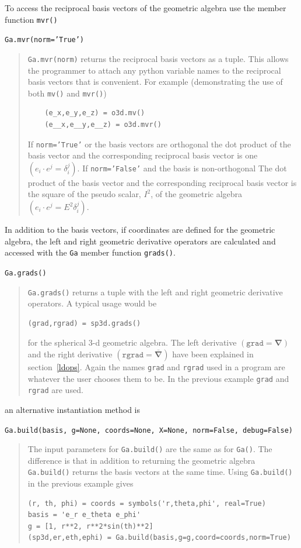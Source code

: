 \documentclass[12pt]{report}
\newcommand{\bm}[1]{\boldsymbol{#1}}
\newcommand{\lp}{\left (}
\newcommand{\rp}{\right )}
\newcommand{\paren}[1]{\lp {#1} \rp}
\newcommand{\T}[1]{\texttt{#1}}
\begin{document}
To access the reciprocal basis vectors of the geometric algebra use the member function \T{mvr()}

\T{Ga.mvr(norm='True')}
\begin{quote}
    \T{Ga.mvr(norm)} returns the reciprocal basis vectors as a tuple.  This allows the programmer to
    attach any python variable names to the reciprocal basis vectors that is convenient. For example
    (demonstrating the use of both \T{mv()} and \T{mvr()})
   \begin{lstlisting}
    (e_x,e_y,e_z) = o3d.mv()
    (e__x,e__y,e__z) = o3d.mvr()
    \end{lstlisting}
    If \T{norm='True'} or the basis vectors are orthogonal
    the dot product of the basis vector and the corresponding reciprocal basis vector is one
    $\paren{e_{i}\cdot e^{j}=\delta_{i}^{j}}$.  If \T{norm='False'} and the basis is non-orthogonal
    The dot product of the basis vector and the corresponding reciprocal basis vector is the square of the
    pseudo scalar, $I^{2}$, of the geometric algebra $\paren{e_{i}\cdot e^{j}=E^{2}\delta_{i}^{j}}$.
\end{quote}

In addition to the basis vectors, if coordinates are defined for the geometric algebra, the
left and right geometric derivative operators are calculated and accessed with the \T{Ga}
member function \T{grads()}.

\T{Ga.grads()}
\begin{quote}
    \T{Ga.grads()} returns a tuple with the left and right geometric derivative operators. A
    typical usage would be
    \begin{lstlisting}[numbers=none]
    (grad,rgrad) = sp3d.grads()
    \end{lstlisting}
    for the spherical 3-d geometric algebra. The left derivative $\paren{\T{grad} =\bm{\nabla}}$ and the
    right derivative $\paren{\T{rgrad} = \bm{\bar{\nabla}}}$ have been explained in section~\ref{ldops}. Again
    the names \T{grad} and \T{rgrad} used in a program are whatever the user chooses them to be.  In the previous
    example \T{grad} and \T{rgrad} are used.
\end{quote}

an alternative instantiation method is

\T{Ga.build(basis, g=None, coords=None, X=None, norm=False, debug=False)}
\begin{quote}
    The input parameters for \T{Ga.build()} are the same as for \T{Ga()}.  The difference is
    that in addition to returning the geometric algebra \T{Ga.build()} returns the basis vectors
    at the same time. Using \T{Ga.build()} in the previous example gives
   \begin{lstlisting}
(r, th, phi) = coords = symbols('r,theta,phi', real=True)
basis = 'e_r e_theta e_phi'
g = [1, r**2, r**2*sin(th)**2]
(sp3d,er,eth,ephi) = Ga.build(basis,g=g,coord=coords,norm=True)
    \end{lstlisting}

\end{quote}
\end{document}
